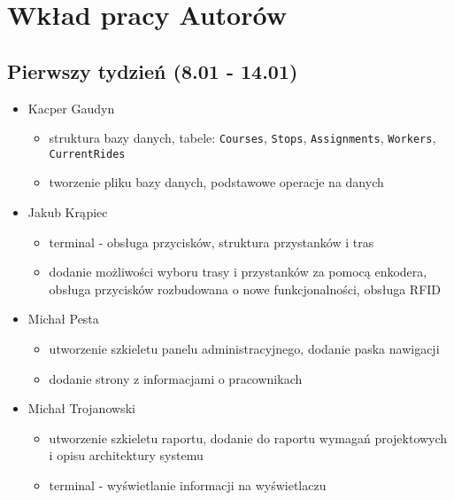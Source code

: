 \section{Wkład pracy Autorów}
\subsection{Pierwszy tydzień (8.01 - 14.01)}
\begin{itemize}
  \item{
    Kacper Gaudyn
    \begin{itemize}
      \item{struktura bazy danych, tabele: \verb|Courses|, \verb|Stops|, \verb|Assignments|, \verb|Workers|, \verb|CurrentRides|}
      \item{tworzenie pliku bazy danych, podstawowe operacje na danych}
    \end{itemize}
  }
  \item{
    Jakub Krąpiec
    \begin{itemize}
      \item{terminal - obsługa przycisków, struktura przystanków i tras}
      \item{dodanie możliwości wyboru trasy i przystanków za pomocą enkodera, obsługa przycisków rozbudowana o nowe funkcjonalności, obsługa RFID}
    \end{itemize}
  }
  \item{
    Michał Pesta
    \begin{itemize}
      \item{utworzenie szkieletu panelu administracyjnego, dodanie paska nawigacji}
      \item{dodanie strony z informacjami o pracownikach}
    \end{itemize}
  }
  \item{
    Michał Trojanowski
    \begin{itemize}
      \item{utworzenie szkieletu raportu, dodanie do raportu wymagań projektowych i opisu architektury systemu}
      \item{terminal - wyświetlanie informacji na wyświetlaczu}
    \end{itemize}
  }
\end{itemize}
